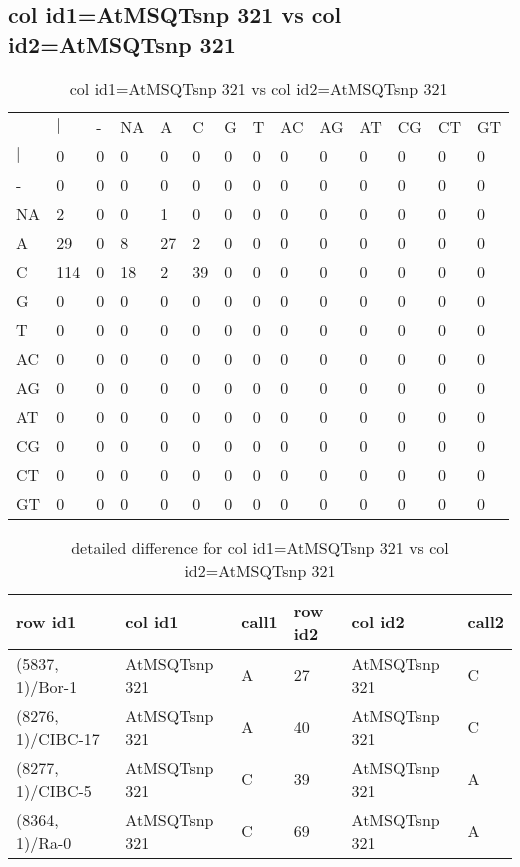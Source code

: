 \subsection{col id1=AtMSQTsnp 321 vs col id2=AtMSQTsnp 321}
\begin{center}
\begin{longtable}{|l|l|l|l|l|l|l|l|l|l|l|l|l|l|}
\caption{col id1=AtMSQTsnp 321 vs col id2=AtMSQTsnp 321} \label{table_dm654}\\
\hline
\\
\hline
&$|$&-&NA&A&C&G&T&AC&AG&AT&CG&CT&GT\\
$|$&0&0&0&0&0&0&0&0&0&0&0&0&0\\
-&0&0&0&0&0&0&0&0&0&0&0&0&0\\
NA&2&0&0&1&0&0&0&0&0&0&0&0&0\\
A&29&0&8&27&2&0&0&0&0&0&0&0&0\\
C&114&0&18&2&39&0&0&0&0&0&0&0&0\\
G&0&0&0&0&0&0&0&0&0&0&0&0&0\\
T&0&0&0&0&0&0&0&0&0&0&0&0&0\\
AC&0&0&0&0&0&0&0&0&0&0&0&0&0\\
AG&0&0&0&0&0&0&0&0&0&0&0&0&0\\
AT&0&0&0&0&0&0&0&0&0&0&0&0&0\\
CG&0&0&0&0&0&0&0&0&0&0&0&0&0\\
CT&0&0&0&0&0&0&0&0&0&0&0&0&0\\
GT&0&0&0&0&0&0&0&0&0&0&0&0&0\\
\hline
\end{longtable}
\end{center}

\begin{center}
\begin{longtable}{|l|l|l|l|l|l|}
\caption{detailed difference for col id1=AtMSQTsnp 321 vs col id2=AtMSQTsnp 321} \label{table_dm655}\\
\hline
row id1&col id1&call1&row id2&col id2&call2\\
\hline
(5837, 1)/Bor-1&AtMSQTsnp 321&A&27&AtMSQTsnp 321&C\\
(8276, 1)/CIBC-17&AtMSQTsnp 321&A&40&AtMSQTsnp 321&C\\
(8277, 1)/CIBC-5&AtMSQTsnp 321&C&39&AtMSQTsnp 321&A\\
(8364, 1)/Ra-0&AtMSQTsnp 321&C&69&AtMSQTsnp 321&A\\
\hline
\end{longtable}
\end{center}

